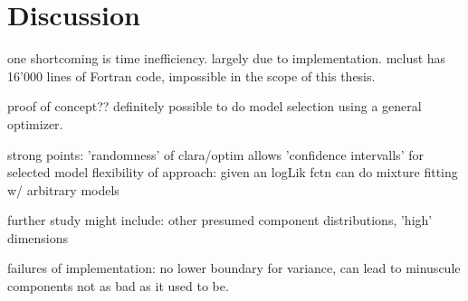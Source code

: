 \chapter{Discussion}




one shortcoming is time inefficiency. largely due to implementation.
mclust has 16'000 lines of Fortran code, impossible in the scope of this thesis.

proof of concept??
definitely possible to do model selection using a general optimizer.

strong points:
'randomness' of clara/optim allows 'confidence intervalls' for selected model
flexibility of approach: given an logLik fctn can do mixture fitting w/ arbitrary
models

further study might include: other presumed component distributions, 'high' dimensions

failures of implementation: no lower boundary for variance, can lead to minuscule components
not as bad as it used to be.
